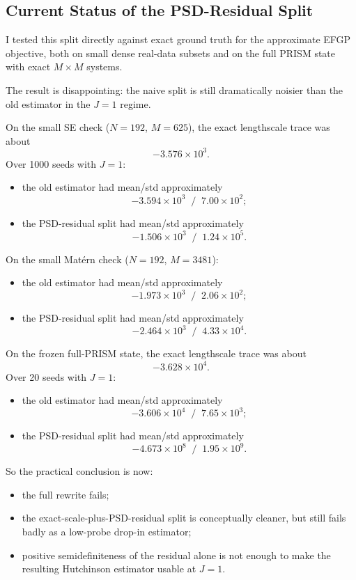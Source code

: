 \documentclass[11pt]{article}
\begin{document}
\subsection*{Current Status of the PSD-Residual Split}

I tested this split directly against exact ground truth for the approximate
EFGP objective, both on small dense real-data subsets and on the full PRISM
state with exact $M\times M$ systems.

The result is disappointing: the naive split is still dramatically noisier than
the old estimator in the $J=1$ regime.

On the small SE check ($N=192$, $M=625$), the exact lengthscale trace was about
\[
-3.576\times 10^3.
\]
Over 1000 seeds with $J=1$:
\begin{itemize}
  \item the old estimator had mean/std approximately
  \[
    -3.594\times 10^3 \;\; / \;\; 7.00\times 10^2;
  \]
  \item the PSD-residual split had mean/std approximately
  \[
    -1.506\times 10^3 \;\; / \;\; 1.24\times 10^5.
  \]
\end{itemize}

On the small Mat\'ern check ($N=192$, $M=3481$):
\begin{itemize}
  \item the old estimator had mean/std approximately
  \[
    -1.973\times 10^3 \;\; / \;\; 2.06\times 10^2;
  \]
  \item the PSD-residual split had mean/std approximately
  \[
    -2.464\times 10^3 \;\; / \;\; 4.33\times 10^4.
  \]
\end{itemize}

On the frozen full-PRISM state, the exact lengthscale trace was about
\[
-3.628\times 10^4.
\]
Over 20 seeds with $J=1$:
\begin{itemize}
  \item the old estimator had mean/std approximately
  \[
    -3.606\times 10^4 \;\; / \;\; 7.65\times 10^3;
  \]
  \item the PSD-residual split had mean/std approximately
  \[
    -4.673\times 10^8 \;\; / \;\; 1.95\times 10^9.
  \]
\end{itemize}

So the practical conclusion is now:
\begin{itemize}
  \item the full rewrite fails;
  \item the exact-scale-plus-PSD-residual split is conceptually cleaner, but
  still fails badly as a low-probe drop-in estimator;
  \item positive semidefiniteness of the residual alone is not enough to make
  the resulting Hutchinson estimator usable at $J=1$.
\end{itemize}
\end{document}
